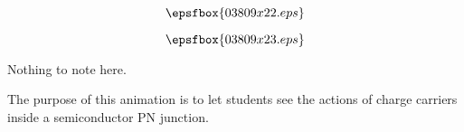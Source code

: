 \vfil \eject
$$\epsfbox{03809x22.eps}$$

\vfil \eject
$$\epsfbox{03809x23.eps}$$


\vfil \eject







Nothing to note here.







The purpose of this animation is to let students see the actions of charge carriers inside a semiconductor PN junction.




